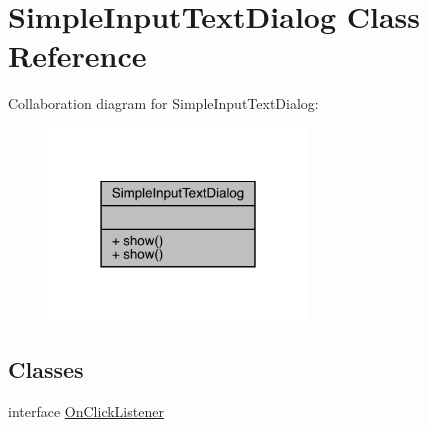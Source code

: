 \hypertarget{classcom_1_1toast_1_1android_1_1gamebase_1_1base_1_1ui_1_1_simple_input_text_dialog}{}\section{Simple\+Input\+Text\+Dialog Class Reference}
\label{classcom_1_1toast_1_1android_1_1gamebase_1_1base_1_1ui_1_1_simple_input_text_dialog}


Collaboration diagram for Simple\+Input\+Text\+Dialog\+:
\nopagebreak
\begin{figure}[H]
\begin{center}
\leavevmode
\includegraphics[width=195pt]{classcom_1_1toast_1_1android_1_1gamebase_1_1base_1_1ui_1_1_simple_input_text_dialog__coll__graph}
\end{center}
\end{figure}
\subsection*{Classes}
\begin{DoxyCompactItemize}
\item 
interface \hyperlink{interfacecom_1_1toast_1_1android_1_1gamebase_1_1base_1_1ui_1_1_simple_input_text_dialog_1_1_on_click_listener}{On\+Click\+Listener}
\end{DoxyCompactItemize}

